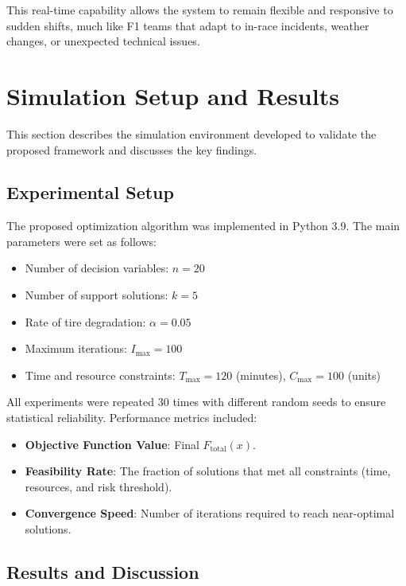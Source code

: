 \documentclass[preprint,12pt]{elsarticle}
\begin{document}
This real-time capability allows the system to remain flexible and responsive to sudden shifts, much like F1 teams that adapt to in-race incidents, weather changes, or unexpected technical issues.

\section{Simulation Setup and Results}
\label{sec:results}

This section describes the simulation environment developed to validate the proposed framework and discusses the key findings.

\subsection{Experimental Setup}

The proposed optimization algorithm was implemented in Python 3.9. The main parameters were set as follows:
\begin{itemize}
    \item Number of decision variables: $n = 20$
    \item Number of support solutions: $k = 5$
    \item Rate of tire degradation: $\alpha = 0.05$
    \item Maximum iterations: $I_{\max} = 100$
    \item Time and resource constraints: $T_{\max} = 120$ (minutes), $C_{\max} = 100$ (units)
\end{itemize}

All experiments were repeated 30 times with different random seeds to ensure statistical reliability. Performance metrics included:
\begin{itemize}
    \item \textbf{Objective Function Value}: Final $F_{\text{total}}(x)$.
    \item \textbf{Feasibility Rate}: The fraction of solutions that met all constraints (time, resources, and risk threshold).
    \item \textbf{Convergence Speed}: Number of iterations required to reach near-optimal solutions.
\end{itemize}

\subsection{Results and Discussion}
\end{document}
